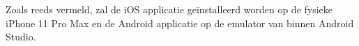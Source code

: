 \subsubsection{}
\label{sec:M-test-voetafdruk-kmm}
Zoals reeds vermeld, zal de iOS applicatie geïnstalleerd worden op de fysieke iPhone 11 Pro Max en de Android applicatie op de emulator van binnen Android Studio.

\begin{figure}
    \centering
    \qquad
    

\end{figure}
